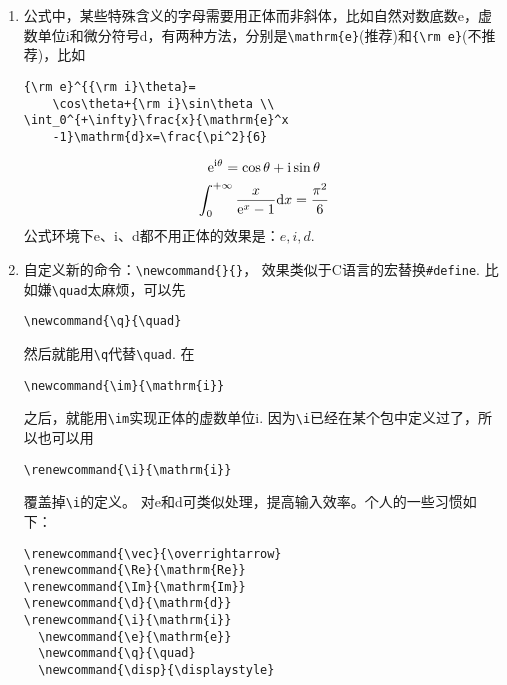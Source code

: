 \documentclass{article}
\newcommand{\q}{\quad}
\begin{document}
\begin{multicols}{2}
\begin{enumerate}
        \item 公式中，某些特殊含义的字母需要用正体而非斜体，比如自然对数底数e，虚数单位i和微分符号d，有两种方法，分别是\verb|\mathrm{e}|(推荐)和\verb|{\rm e}|(不推荐)，比如
              \begin{lstlisting}
{\rm e}^{{\rm i}\theta}=
    \cos\theta+{\rm i}\sin\theta \\
\int_0^{+\infty}\frac{x}{\mathrm{e}^x
    -1}\mathrm{d}x=\frac{\pi^2}{6}    
\end{lstlisting}
              \begin{gather*}
                  {\rm e}^{{\rm i}\theta}=\cos\theta+{\rm i}\sin\theta \\
                  \int_{0}^{+\infty}\dfrac{x}{\mathrm{e}^x
                      -1}\mathrm{d}x=\dfrac{\pi^2}{6}
              \end{gather*}
              公式环境下e、i、d都不用正体的效果是：$ e,i,d $.

        \item 自定义新的命令：\verb|\newcommand{}{}|，
              效果类似于C语言的宏替换\verb|#define|.
              比如嫌\verb|\quad|太麻烦，可以先
              \begin{lstlisting}
\newcommand{\q}{\quad}    
\end{lstlisting}
              然后就能用\verb|\q|代替\verb|\quad|.
              在
              \begin{lstlisting}
\newcommand{\im}{\mathrm{i}}    
\end{lstlisting}
              之后，就能用\verb|\im|实现正体的虚数单位$ \mathrm{i} $.
              因为\verb|\i|已经在某个包中定义过了，所以也可以用
              \begin{lstlisting}
\renewcommand{\i}{\mathrm{i}}    
\end{lstlisting}
              覆盖掉\verb|\i|的定义。
              对e和d可类似处理，提高输入效率。个人的一些习惯如下：
              \begin{lstlisting}
\renewcommand{\vec}{\overrightarrow}
\renewcommand{\Re}{\mathrm{Re}}
\renewcommand{\Im}{\mathrm{Im}}
\renewcommand{\d}{\mathrm{d}}
\renewcommand{\i}{\mathrm{i}} 
  \newcommand{\e}{\mathrm{e}}
  \newcommand{\q}{\quad}
  \newcommand{\disp}{\displaystyle}    
\end{lstlisting}


\end{enumerate}
\end{multicols}
\end{document}
